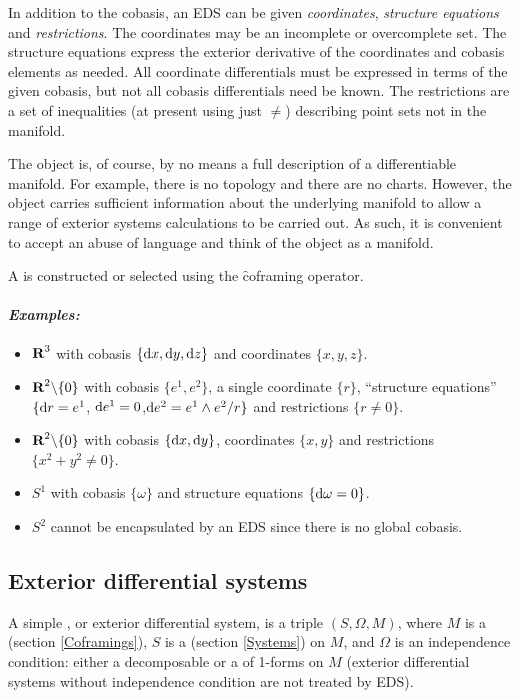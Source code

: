 In addition to the cobasis, an EDS  can be given {\it
coordinates}, {\it structure equations} and {\it restrictions}. The
coordinates may be an incomplete or overcomplete set. The structure
equations express the exterior derivative of the coordinates and cobasis
elements as needed.  All coordinate differentials must be expressed in
terms of the given cobasis, but not all cobasis differentials need be
known. The restrictions are a set of inequalities (at present using just
$\neq$) describing point sets not in the manifold. 

The  object is, of course, by no means a full
description of a differentiable manifold. For example, there is no
topology and there are no charts. However, the  object
carries sufficient information about the underlying manifold to allow a
range of exterior systems calculations to be carried out. As such, it is
convenient to accept an abuse of language and think of the
 object as a manifold. 

A  is constructed or selected using the \f{coframing}
operator. 

\paragraph{\it Examples:}
\begin{itemize}
\item $\hbox{\bf R}^3$ with cobasis $\{{\rm d} x,{\rm d} y,{\rm d} z\}$ and coordinates $\{x,y,z\}$.
\item $\hbox{\bf R}^2\backslash\{0\}$ with cobasis $\{e^1,e^2\}$, a single
	coordinate $\{r\}$, ``structure equations'' $\{{\rm d} r = e^1$,
	${\rm d} e^1=0$,${\rm d} e^2=e^1\wedge e^2/r\}$ and restrictions $\{r\neq0\}$.
\item $\hbox{\bf R}^2\backslash\{0\}$ with cobasis $\{{\rm d} x,{\rm d} y\}$,
	coordinates $\{x,y\}$ and restrictions $\{x^2+y^2\neq0\}$.
\item $S^1$ with cobasis $\{\omega\}$ and structure equations 
	$\{{\rm d}\omega = 0\}$.
\item $S^2$ cannot be encapsulated by an EDS  since there
        is no global cobasis.
\end{itemize}

\subsection{Exterior differential systems}
\label{Exterior differential systems}

A simple , or exterior differential system, is a triple
$(S,\Omega,M)$, where $M$ is a  (section
\ref{Coframings}), $S$ is a  (section \ref{Systems}) on
$M$, and $\Omega$ is an independence condition: either a decomposable
 or a  of 1-forms on $M$ (exterior
differential systems without independence condition are not treated by
EDS). 

